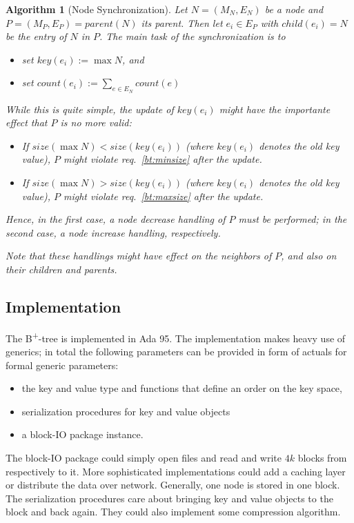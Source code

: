 \documentclass[a4paper, 9pt]{scrartcl}
\theoremstyle{plain}
\newtheorem{algo}[thm]{Algorithm}
\theoremstyle{definition}
\theoremstyle{remark}
\begin{document}
\begin{multicols}{2}
\begin{algo}[Node Synchronization]
Let \mbox{$N = (M_N, E_N)$} be a node and \mbox{$P = (M_P, E_P)  = parent(N)$}
its parent.
Then let \mbox{$e_i \in E_P$} with \mbox{$child(e_i) = N$} be the entry of
$N$ in $P$.
The main task of the synchronization is to
\begin{itemize}
\item set \mbox{$key(e_i) := \max N$}, and
\item set \mbox{$count(e_i) := \sum_{e \in E_N} count(e)$}
\end{itemize}

While this is quite simple, the update of $key(e_i)$ might have the 
importante effect that $P$ is {\em no more valid}:
\begin{itemize}
\item If \mbox{$size(\max N) < size(key(e_i))$} (where $key(e_i)$ denotes the
	{\em old} key value), $P$ might violate req.~\ref{bt:minsize}
	after the update.
\item If \mbox{$size(\max N) > size(key(e_i))$} (where $key(e_i)$ denotes the
	{\em old} key value), $P$ might violate req.~\ref{bt:maxsize}
	after the update.
\end{itemize}
Hence, in the first case, a node decrease handling of $P$ must be performed;
in the second case, a node increase handling, respectively.

Note that these handlings might have effect on the neighbors of $P$,
and also on their children and parents.
\end{algo}


\subsection{Implementation}
The B\textsuperscript{+}-tree is implemented in Ada 95.
The implementation makes heavy use of generics; in total the following
parameters can be provided in form of actuals for formal generic parameters:
\begin{itemize}
\item the key and value type and functions that define an order on the
	key space,
\item serialization procedures for key and value objects
\item a block-IO package instance.
\end{itemize}
The block-IO package could simply open files and read and write $4k$ blocks
from respectively to it.
More sophisticated implementations could add a caching layer or distribute the
data over network.
Generally, one node is stored in one block. The serialization procedures
care about bringing key and value objects to the block and back again.
They could also implement some compression algorithm.



\end{multicols}
\end{document}
